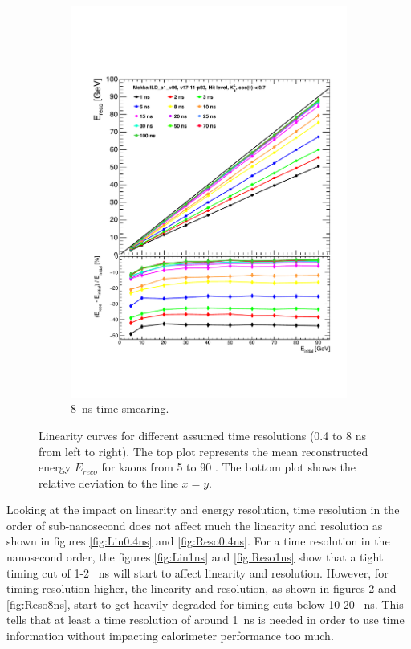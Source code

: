 \begin{figure}[t]
\begin{subfigure}[t]{0.5\textwidth}
    \includegraphics[width=1\linewidth]{chap6/fig_TimingILD/8ns_Smearing/Linearity_TimeCuts_Smearing8ns}
    \vspace{-6ex}
    \caption{\SI{8}{\nano\second} time smearing.}  \label{fig:Lin8ns}
  \end{subfigure}
  \caption{Linearity curves for different assumed time resolutions (0.4 to 8 ns from left to right). The top plot represents the mean reconstructed energy $E_{reco}$ for kaons from 5 to 90 \GeV. The bottom plot shows the relative deviation to the line $x=y$.}
\end{figure}

Looking at the impact on linearity and energy resolution, time resolution in the order of sub-nanosecond does not affect much the linearity and resolution as shown in figures \ref{fig:Lin0.4ns} and \ref{fig:Reso0.4ns}. For a time resolution in the nanosecond order, the figures \ref{fig:Lin1ns} and \ref{fig:Reso1ns} show that a tight timing cut of 1-2 \SI{}{\nano\second} will start to affect linearity and resolution. However, for timing resolution higher, the linearity and resolution, as shown in figures \ref{fig:Lin8ns} and \ref{fig:Reso8ns}, start to get heavily degraded for timing cuts below 10-20 \SI{}{\nano\second}. This tells that at least a time resolution of around \SI{1}{\nano\second} is needed in order to use time information without impacting calorimeter performance too much.

